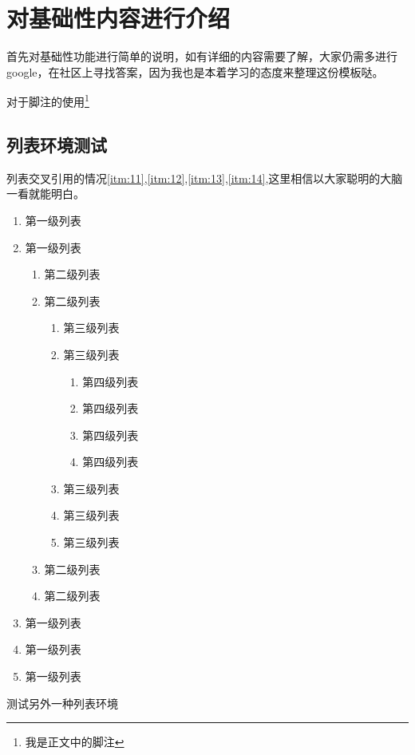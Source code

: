 
\chapter{对基础性内容进行介绍}
首先对基础性功能进行简单的说明，如有详细的内容需要了解，大家仍需多进行google，在社区上寻找答案，因为我也是本着学习的态度来整理这份模板哒。

对于脚注的使用{\footnote{我是正文中的脚注}}

\section{列表环境测试}
列表交叉引用的情况\ref{itm:11},\ref{itm:12},\ref{itm:13},\ref{itm:14},这里相信以大家聪明的大脑一看就能明白。

\begin{enumerate}
	\item 第一级列表\label{itm:11}
	\item 第一级列表
	\begin{enumerate}
		\item 第二级列表\label{itm:12}
		\item 第二级列表
		\begin{enumerate}
			\item 第三级列表\label{itm:13}
			\item 第三级列表
			\begin{enumerate}
				\item 第四级列表\label{itm:14}
				\item 第四级列表
				\item 第四级列表
				\item 第四级列表
			\end{enumerate}
			\item 第三级列表
			\item 第三级列表
			\item 第三级列表
		\end{enumerate}
		\item 第二级列表
		\item 第二级列表
	\end{enumerate}
	\item 第一级列表
	\item 第一级列表
	\item 第一级列表
\end{enumerate}
测试另外一种列表环境
